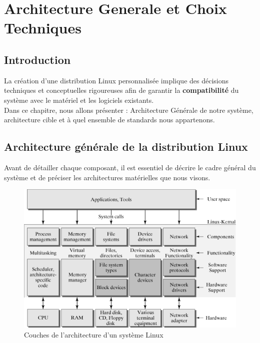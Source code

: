 \chapter{Architecture Generale et Choix Techniques} \label{chap:archgenerale}
\minitoc
\clearpage


\section{Introduction}

La création d’une distribution Linux personnalisée implique des décisions techniques et conceptuelles rigoureuses afin de garantir la \textbf{compatibilité} du système avec le matériel et les logiciels existants.  \\

Dans ce chapitre, nous allons  présenter : Architecture Générale de notre système, architecture cible  et   à quel ensemble de standards   nous appartenons.

 


\section{Architecture générale de la distribution Linux}
Avant de détailler chaque composant, il est essentiel de décrire le cadre général du système et de préciser les architectures matérielles que nous visons.

\begin{figure}[htbp]
    \centering
    \includegraphics[width=1\textwidth]{images_pfe/linuxarchi.png}
    \caption{Couches de l’architecture d’un système Linux}
    \label{fig:linux-archi}
\end{figure}

